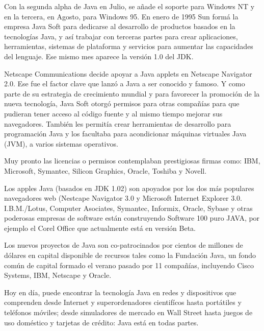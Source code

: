 \documentclass[11pt,a4paper]{article}
\begin{document}
\begin{multicols}{2}
Con la segunda alpha de Java en Julio, se añade el soporte para Windows NT y en la tercera, en Agosto, para Windows 95. 
En enero de 1995 Sun formá la empresa Java Soft para dedicarse al desarrollo de productos basados en la tecnologías Java, y así trabajar con terceras partes para crear aplicaciones, herramientas, sistemas de plataforma y servicios para aumentar las capacidades del lenguaje. Ese mismo mes aparece la versión 1.0 del JDK.

Netscape Communications decide apoyar a Java applets en Netscape Navigator 2.0. Ese fue el factor clave que lanzó a Java a ser conocido y famoso. 
Y como parte de su estrategia de crecimiento mundial y para favorecer la promoción de la nueva tecnología, Java Soft otorgó permisos para otras compañías para que pudieran tener acceso al código fuente y al mismo tiempo mejorar sus navegadores. 
También les permitía crear herramientas de desarrollo para programación Java y los facultaba para acondicionar máquinas virtuales Java (JVM), a varios sistemas operativos.

Muy pronto las licencias o permisos contemplaban prestigiosas firmas como: IBM, Microsoft, Symantec, Silicon Graphics, Oracle, Toshiba y Novell.

Los apples Java (basados en JDK 1.02) son apoyados por los dos más populares navegadores web (Nestcape Navigator 3.0 y Microsoft Internet Explorer 3.0. I.B.M./Lotus, Computer Asociates, Symantec, Informix, Oracle, Sybase y otras poderosas empresas de software están construyendo Software 100 puro JAVA, por ejemplo el Corel Office que actualmente está en versión Beta.

Los nuevos proyectos de Java son co-patrocinados por cientos de millones de dólares en capital disponible de recursos tales como la Fundación Java, un fondo común de capital formado el verano pasado por 11 compañías, incluyendo Cisco Systems, IBM, Netscape y Oracle.

Hoy en día, puede encontrar la tecnología Java en redes y dispositivos que comprenden desde Internet y superordenadores cientifícos hasta portátiles y teléfonos móviles; desde simuladores de mercado en Wall Street hasta juegos de uso doméstico y tarjetas de crédito: Java está en todas partes.



\end{multicols}
\end{document}

